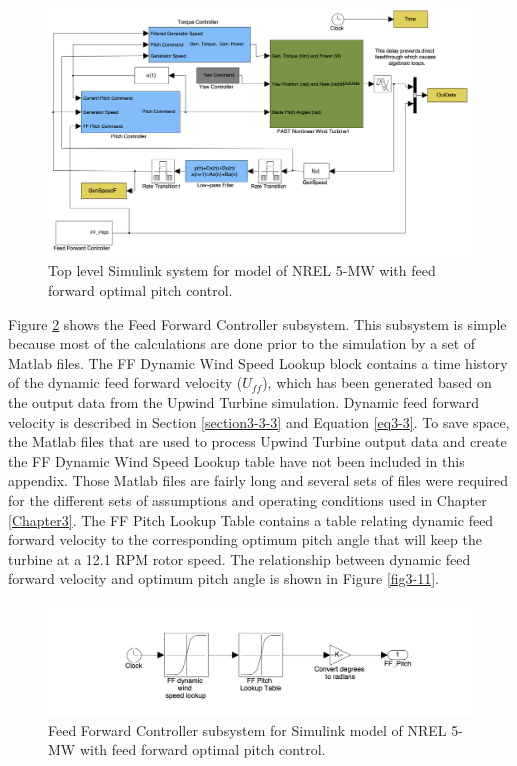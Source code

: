 \begin{figure}[ht]
	\centering
		\includegraphics[width=\linewidth]{Figures/AppendixBFigures/FF_Pitch1.png}
	\caption{Top level Simulink system for model of NREL 5-MW with feed forward optimal pitch control.}
	\label{figB-7}
\end{figure}

Figure \ref{figB-8} shows the Feed Forward Controller subsystem. This subsystem is simple because most of the calculations are done prior to the simulation by a set of Matlab files. The FF Dynamic Wind Speed Lookup block contains a time history of the dynamic feed forward velocity ($U_{ff}$), which has been generated based on the output data from the Upwind Turbine simulation. Dynamic feed forward velocity is described in Section \ref{section3-3-3} and Equation \ref{eq3-3}. To save space, the Matlab files that are used to process Upwind Turbine output data and create the FF Dynamic Wind Speed Lookup table have not been included in this appendix. Those Matlab files are fairly long and several sets of files were required for the different sets of assumptions and operating conditions used in Chapter \ref{Chapter3}. The FF Pitch Lookup Table contains a table relating dynamic feed forward velocity to the corresponding optimum pitch angle that will keep the turbine at a 12.1 RPM rotor speed. The relationship between dynamic feed forward velocity and optimum pitch angle is shown in Figure \ref{fig3-11}.

\begin{figure}[ht]
	\centering
		\includegraphics[width=\linewidth]{Figures/AppendixBFigures/FF_Pitch2.png}
	\caption{Feed Forward Controller subsystem for Simulink model of NREL 5-MW with feed forward optimal pitch control.}
	\label{figB-8}
\end{figure}

